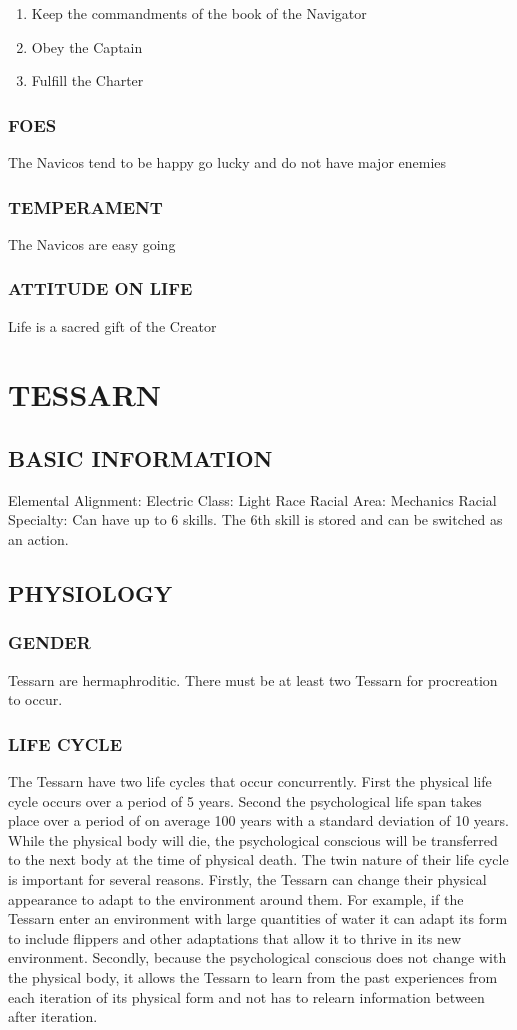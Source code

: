 \begin{enumerate}
\item Keep the commandments of the book of the Navigator
\item Obey the Captain
\item Fulfill the Charter
\end{enumerate}

\subsubsection{FOES}
The Navicos tend to be happy go lucky and do not have major enemies
\subsubsection{TEMPERAMENT}
The Navicos are easy going
\subsubsection{ATTITUDE ON LIFE}
Life is a sacred gift of the Creator


\section{TESSARN}
\subsection{BASIC INFORMATION}
Elemental Alignment: Electric
Class: Light Race
Racial Area: Mechanics
Racial Specialty: Can have up to 6 skills.  The 6th skill is stored and can be switched as an action.
\subsection{PHYSIOLOGY}
\subsubsection{GENDER}
Tessarn are hermaphroditic.  There must be at least two Tessarn for procreation
to occur.  
\subsubsection{LIFE CYCLE}
The Tessarn have two life cycles that occur concurrently.  First the physical
life cycle occurs over a period of 5 years.  Second the psychological life span
takes place over a period of on average 100 years with a standard deviation of
10 years.  While the physical body will die, the psychological conscious will
be transferred to the next body at the time of physical death.  The twin nature
of their life cycle is important for several reasons.  Firstly, the Tessarn can
change their physical appearance to adapt to the environment around them.  For
example, if the Tessarn enter an environment with large quantities of water it
can adapt its form to include flippers and other adaptations that allow it to
thrive in its new environment.  Secondly, because the psychological conscious
does not change with the physical body, it allows the Tessarn to learn from the
past experiences from each iteration of its physical form and not has to
relearn information between after iteration.    
